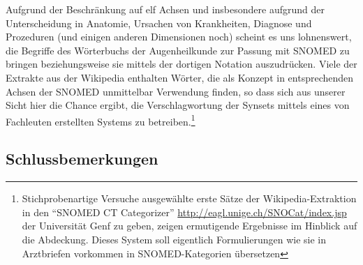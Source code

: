 \documentclass[pagesize,DIV=calc,12pt,final]{scrreprt}
\begin{document}
Aufgrund der Beschränkung auf elf Achsen und insbesondere aufgrund der Unterscheidung in Anatomie, Ursachen von Krankheiten, Diagnose und Prozeduren (und einigen anderen Dimensionen noch) scheint es uns lohnenswert, die Begriffe des Wörterbuchs der Augenheilkunde zur Passung mit SNOMED zu bringen beziehungsweise sie mittels der dortigen Notation auszudrücken.
Viele der Extrakte aus der Wikipedia enthalten Wörter, die als Konzept in entsprechenden Achsen der SNOMED unmittelbar Verwendung finden, so dass sich aus unserer Sicht hier die Chance ergibt, die Verschlagwortung der Synsets mittels eines von Fachleuten erstellten Systems zu betreiben.\footnote{Stichprobenartige Versuche ausgewählte erste Sätze der Wikipedia-Extraktion in den \enquote{SNOMED CT Categorizer} \href{http://eagl.unige.ch/SNOCat/index.jsp}{http://eagl.unige.ch/SNOCat/index.jsp} der Universität Genf zu geben, zeigen ermutigende Ergebnisse im Hinblick auf die Abdeckung. Dieses System soll eigentlich Formulierungen wie sie in Arztbriefen vorkommen in SNOMED-Kategorien übersetzen}


\subsection{Schlussbemerkungen}
\end{document}
